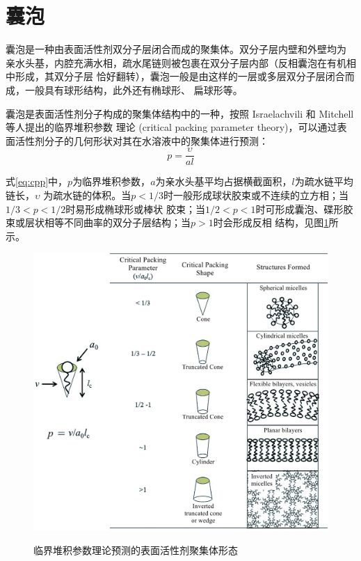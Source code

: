 \documentclass[bachelor,winfonts,replaceperiod]{jnuthesis}
\begin{document}
    \section{囊泡}
    囊泡是一种由表面活性剂双分子层闭合而成的聚集体。双分子层内壁和外壁均为
    亲水头基，内腔充满水相，疏水尾链则被包裹在双分子层内部（反相囊泡在有机相中形成，其双分子层
    恰好翻转），囊泡一般是由这样的一层或多层双分子层闭合而成，一般具有球形结构，此外还有椭球形、
    扁球形等。
    
    囊泡是表面活性剂分子构成的聚集体结构中的一种，按照 Israelachvili 和 Mitchell 等人提出的临界堆积参数
    理论 (critical packing parameter theory)，可以通过表面活性剂分子的几何形状对其在水溶液中的聚集体进行预测：
    \begin{equation}\label{eq:cpp}
        p=\frac{\upsilon}{al}
    \end{equation}
    
    式\ref{eq:cpp}中，$p$为临界堆积参数，$a$为亲水头基平均占据横截面积，$l$为疏水链平均链长，$\upsilon$
    为疏水链的体积。当$p<1/3$时一般形成球状胶束或不连续的立方相；当$1/3<p<1/2$时易形成椭球形或棒状
    胶束；当$1/2<p<1$时可形成囊泡、碟形胶束或层状相等不同曲率的双分子层结构；当$p>1$时会形成反相
    结构，见图\ref{fig:scheme-cpp}所示。
    \begin{figure}[htbp]
        \centering
        \includegraphics[width= .826\textwidth]{figure/scheme-cpp.png}\\
        \caption{临界堆积参数理论预测的表面活性剂聚集体形态\cite{salim2014}}\label{fig:scheme-cpp}
    \end{figure}
\end{document}
